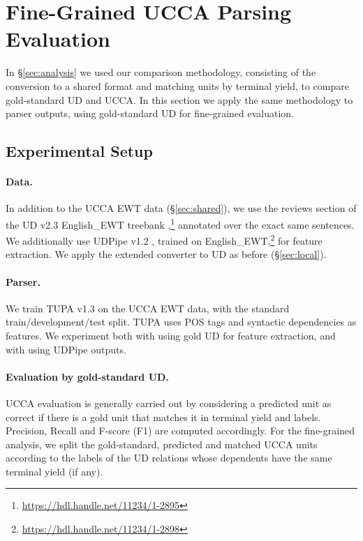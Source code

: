 \documentclass[11pt,a4paper,table]{article}
\begin{document}
\section{Fine-Grained UCCA Parsing Evaluation}\label{sec:fine_grained}

In \S\ref{sec:analysis} we used our comparison methodology,
consisting of the conversion to a shared format and matching units by terminal yield,
to compare gold-standard UD and UCCA.
In this section we apply the same methodology to parser outputs,
using gold-standard UD for fine-grained evaluation.

\subsection{Experimental Setup}\label{sec:experiments}

\paragraph{Data.}

In addition to the UCCA EWT data (\S\ref{sec:shared}),
we use the reviews section of the UD v2.3 English\_EWT treebank
\cite{11234/1-2895},\footnote{\url{https://hdl.handle.net/11234/1-2895}}
annotated over the exact same sentences.
We additionally use UDPipe v1.2 \cite{udpipe,udpipe:2017},
trained on
English\_EWT,\footnote{\url{https://hdl.handle.net/11234/1-2898}}
for feature extraction.
We apply the extended converter to UD as before (\S\ref{sec:local}).

\paragraph{Parser.}

We train TUPA v1.3 \cite{hershcovich2017a,hershcovich2018multitask}
on the UCCA EWT data, with the standard train/development/test split.
TUPA uses POS tags and syntactic dependencies as features.
We experiment both with using gold UD for feature extraction,
and with using UDPipe outputs.


\paragraph{Evaluation by gold-standard UD.}

UCCA evaluation is generally carried out by considering a predicted unit as correct if there
is a gold unit that matches it in terminal yield and labels. Precision, Recall and F-score (F1)
are computed accordingly.
For the fine-grained analysis, we split the gold-standard, predicted and matched UCCA units according
to the labels of the UD relations whose dependents have the same terminal yield (if any).
\end{document}
